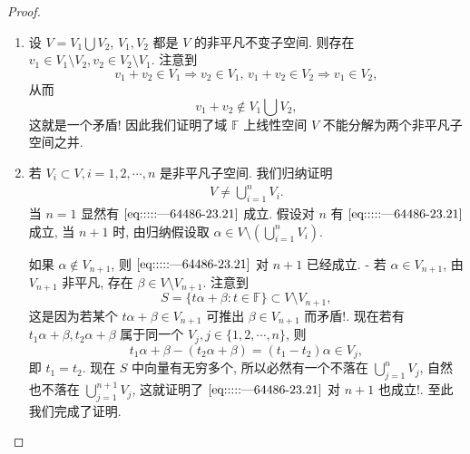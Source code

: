 \documentclass[../../main.tex]{subfiles}%
\begin{document}
\begin{proof}
\begin{enumerate}[(1)]
{\color{blue}证法三:}设$V=\bigcup_{i=1}^m{V_i}$,其中$m\geqslant 2$,$V_i$都是非平凡子空间.考虑 \( V \) 的基 \( e_1, e_2, \cdots, e_n \) 和一组向量  
\[
\alpha_i = e_1 + i e_2 + i^2 e_3 + \cdots + i^{n-1} e_n, \quad i = 1, 2, \cdots.
\] 
从而
\begin{align*}
\left( \alpha _{i_1},\alpha _{i_2},\cdots ,\alpha _{i_n} \right) =\left( e_1,e_2,\cdots ,e_n \right) \left( \begin{matrix}
1&		1&		\cdots&		1\\
i_1&		i_2&		\cdots&		i_n\\
\vdots&		\vdots&		&		\vdots\\
i_{1}^{n-1}&		i_{2}^{n-1}&		\cdots&		i_{n}^{n-1}\\
\end{matrix} \right) ,i_1,\cdots ,i_n\in \mathbb{N} .
\end{align*}
由Vandermonde行列式的性质, 上面这组向量$\{\alpha_i\}_{i=1}^{\infty}$中任何 \( n \) 个都线性无关. 而其中必有无限个$\alpha_i$落入某个题设 \( V \) 的某个非平凡子空间$V_i$中,否则,$V=\bigcup_{i=1}^nV_i$中只包含$\{\alpha_i\}_{i=1}^{\infty}$中有限个向量,这与$\{\alpha_i\}_{i=1}^{\infty}\subset V$矛盾! 从而这个子空间至少是\( n \)维的, 这和其是非平凡子空间矛盾!  

\item 设 \( V = V_1 \bigcup V_2 \), \( V_1, V_2 \) 都是 \( V \) 的非平凡不变子空间. 则存在 \( v_1 \in V_1 \setminus V_2, v_2 \in V_2 \setminus V_1 \). 注意到
\[
v_1 + v_2 \in V_1 \Rightarrow v_2 \in V_1, \, v_1 + v_2 \in V_2 \Rightarrow v_1 \in V_2,
\]  
从而  
\[
v_1 + v_2 \notin V_1 \bigcup V_2,
\]  
这就是一个矛盾! 因此我们证明了域 \( \mathbb{F} \) 上线性空间 \( V \) 不能分解为两个非平凡子空间之并.  

\item 若 \( V_i \subset V, i = 1, 2, \cdots, n \) 是非平凡子空间. 我们归纳证明  
\begin{align}
V \neq \bigcup_{i=1}^n V_i. \label{eq:::::---64486-23.21}
\end{align}
当 \( n = 1 \) 显然有 \(\eqref{eq:::::---64486-23.21}\) 成立. 假设对 \( n \) 有 \(\eqref{eq:::::---64486-23.21}\) 成立, 当 \( n + 1 \) 时, 由归纳假设取 \( \alpha \in V \setminus \left( \bigcup_{i=1}^n V_i \right) \).  

如果 \( \alpha \notin V_{n+1} \), 则 \(\eqref{eq:::::---64486-23.21}\) 对 \( n + 1 \) 已经成立.  
- 若 \( \alpha \in V_{n+1} \), 由 \( V_{n+1} \) 非平凡, 存在 \( \beta \in V \setminus V_{n+1} \). 注意到  
\[
S = \{ t\alpha + \beta : t \in \mathbb{F} \} \subset V \setminus V_{n+1},
\]  
这是因为若某个 \( t\alpha + \beta \in V_{n+1} \) 可推出 \( \beta \in V_{n+1} \) 而矛盾!. 现在若有 \( t_1\alpha + \beta, t_2\alpha + \beta \) 属于同一个 \( V_j, j \in \{1, 2, \cdots, n\} \), 则  
\[
t_1\alpha + \beta - (t_2\alpha + \beta) = (t_1 - t_2) \alpha \in V_j,
\]  
即 \( t_1 = t_2 \). 现在 \( S \) 中向量有无穷多个, 所以必然有一个不落在 \( \bigcup_{j=1}^n V_j \), 自然也不落在 \( \bigcup_{j=1}^{n+1} V_j \), 这就证明了 \(\eqref{eq:::::---64486-23.21}\) 对 \( n + 1 \) 也成立!.  
至此我们完成了证明.
\end{enumerate}
\end{proof}
\end{document}
